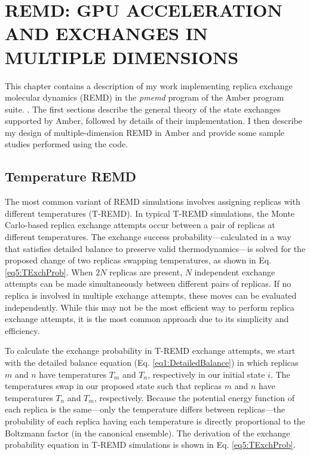 \chapter{REMD: GPU ACCELERATION AND EXCHANGES IN MULTIPLE DIMENSIONS}
\label{ch5}

This chapter contains a description of my work implementing replica exchange
molecular dynamics (REMD) in the \emph{pmemd} program of the Amber program
suite. \cite{AMBER12}. The first sections describe the general theory of the
state exchanges supported by Amber, followed by details of their implementation.
I then describe my design of multiple-dimension REMD in Amber and provide some
sample studies performed using the code.

\section{Temperature REMD}

The most common variant of REMD simulations involves assigning replicas with
different temperatures (T-REMD). \cite{Sugita_ChemPhysLett_1999_v314_p141} In
typical T-REMD simulations, the Monte Carlo-based replica exchange attempts
occur between a pair of replicas at different temperatures. The exchange success
probability---calculated in a way that satisfies detailed balance to preserve
valid thermodynamics---is solved for the proposed change of two replicas
swapping temperatures, as shown in Eq. \ref{eq5:TExchProb}.  When $2N$ replicas
are present, $N$ independent exchange attempts can be made simultaneously
between different pairs of replicas. If no replica is involved in multiple
exchange attempts, these moves can be evaluated independently. While this may
not be the most efficient way to perform replica exchange attempts, it is the
most common approach due to its simplicity and efficiency.

To calculate the exchange probability in T-REMD exchange attempts, we start with
the detailed balance equation (Eq. \ref{eq1:DetailedBalance}) in which replicas
$m$ and $n$ have temperatures $T_m$ and $T_n$, respectively in our initial state
$i$. The temperatures swap in our proposed state such that replicas $m$ and $n$
have temperatures $T_n$ and $T_m$, respectively. Because the potential energy
function of each replica is the same---only the temperature differs between
replicas---the probability of each replica having each temperature is directly
proportional to the Boltzmann factor (in the canonical ensemble). The derivation
of the exchange probability equation in T-REMD simulations is shown in Eq.
\ref{eq5:TExchProb}.

